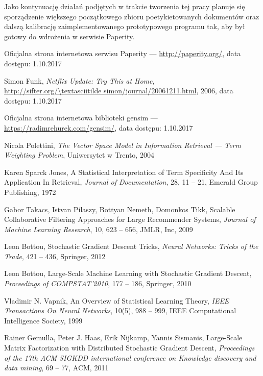 \documentclass{pracamgr}
\begin{document}
Jako kontynuację działań podjętych w trakcie tworzenia tej pracy planuje się sporządzenie większego początkowego zbioru poetykietowanych dokumentów oraz dalszą kalibrację zaimplementowanego prototypowego programu tak, aby był gotowy do wdrożenia w serwisie Paperity.

\begin{thebibliography}{99}

 Oficjalna strona internetowa serwisu Paperity --- \url{http://paperity.org/}, data dostępu: 1.10.2017

 Simon Funk, \textit{Netflix Update: Try This at Home},\\ \url{http://sifter.org/\textasciitilde simon/journal/20061211.html}, 2006, data dostępu: 1.10.2017

 Oficjalna strona internetowa biblioteki gensim --- \url{https://radimrehurek.com/gensim/}, data dostępu: 1.10.2017

 Nicola Polettini, \textit{The Vector Space Model in Information Retrieval --- Term Weighting Problem}, Uniwersytet w Trento, 2004

 Karen Sparck Jones, A Statistical Interpretation of Term Specificity And Its Application In Retrieval, \textit{Journal of Documentation}, 28, 11 -- 21, Emerald Group Publishing, 1972

 Gabor Takacs, Istvan Pilaszy, Bottyan Nemeth, Domonkos Tikk, Scalable Collaborative Filtering Approaches for Large Recommender Systems, \textit{Journal of Machine Learning Research}, 10, 623 -- 656, JMLR, Inc, 2009

 Leon Bottou, Stochastic Gradient Descent Tricks, \textit{Neural Networks: Tricks of the Trade}, 421 -- 436, Springer, 2012

 Leon Bottou, Large-Scale Machine Learning with Stochastic Gradient Descent, \textit{Proceedings of COMPSTAT'2010}, 177 -- 186, Springer, 2010

 Vladimir N. Vapnik, An Overview of Statistical Learning Theory, \textit{IEEE Transactions On Neural Networks}, 10(5), 988 -- 999, IEEE Computational Intelligence Society, 1999

 Rainer Gemulla, Peter J. Haas, Erik Nijkamp, Yannis Sismanis, Large-Scale Matrix Factorization with Distributed Stochastic Gradient Descent, \textit{Proceedings of the 17th ACM SIGKDD international conference on Knowledge discovery and data mining}, 69 -- 77, ACM, 2011


\end{thebibliography}
\end{document}
